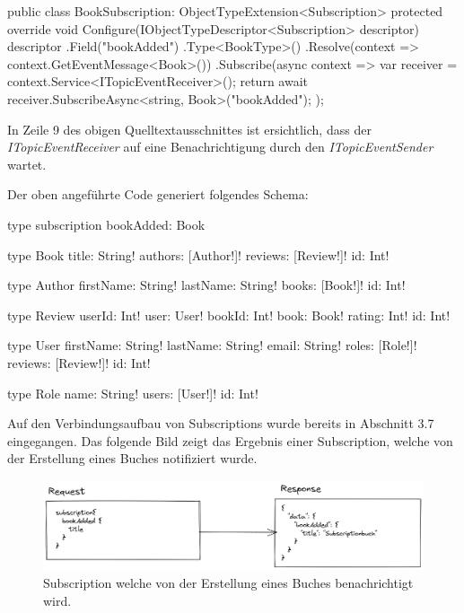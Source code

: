 \begin{JsCode}
public class BookSubscription: ObjectTypeExtension<Subscription> {
    protected override void Configure(IObjectTypeDescriptor<Subscription> descriptor) {
        descriptor
        .Field("bookAdded")
        .Type<BookType>()
        .Resolve(context => context.GetEventMessage<Book>())
        .Subscribe(async context => {
            var receiver = context.Service<ITopicEventReceiver>();
            return await receiver.SubscribeAsync<string, Book>("bookAdded");
        });
    }
}    
\end{JsCode}
In Zeile 9 des obigen Quelltextausschnittes ist ersichtlich, dass der \textit{ITopicEventReceiver} auf eine Benachrichtigung durch den \textit{ITopicEventSender} wartet.

Der oben angeführte Code generiert folgendes Schema:
\begin{JsCode}
type subscription{
    bookAdded: Book
}

type Book {
  title: String!
  authors: [Author!]!
  reviews: [Review!]!
  id: Int!
}

type Author {
  firstName: String!
  lastName: String!
  books: [Book!]!
  id: Int!
}

type Review {
  userId: Int!
  user: User!
  bookId: Int!
  book: Book!
  rating: Int!
  id: Int!
}

type User {
  firstName: String!
  lastName: String!
  email: String!
  roles: [Role!]!
  reviews: [Review!]!
  id: Int!
}

type Role {
  name: String!
  users: [User!]!
  id: Int!
}
\end{JsCode}

Auf den Verbindungsaufbau von Subscriptions wurde bereits in Abschnitt 3.7 eingegangen.
Das folgende Bild zeigt das Ergebnis einer Subscription, welche von der Erstellung eines Buches notifiziert wurde.

\begin{figure}[H]
    \includegraphics[width=\textwidth]{pics/bookSubscription.png}
    \caption{Subscription welche von der Erstellung eines Buches benachrichtigt wird.}
\end{figure}

